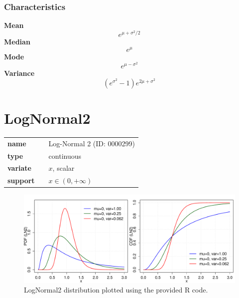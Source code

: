 \subsubsection*{Characteristics}
\smallskip \noindent \hspace{.2cm} \textbf{Mean} 
\begin{equation*}e^{\mu+\sigma^2/2}\end{equation*}
\smallskip \noindent \hspace{.2cm} \textbf{Median} 
\begin{equation*}e^{\mu}\end{equation*}
\smallskip \noindent \hspace{.2cm} \textbf{Mode} 
\begin{equation*}e^{\mu-\sigma^2}\end{equation*}
\smallskip \noindent \hspace{.2cm} \textbf{Variance} 
\begin{equation*}(e^{\sigma^2}\!\!-1) e^{2\mu+\sigma^2}\end{equation*}
\smallskip
\section*{LogNormal2} 

  \bigskip 

\begin{tabular}{p{2cm}cl}
\textbf{name} & & Log-Normal 2 (ID: 0000299)\\ 
 
\textbf{type} & & continuous \\ 

\textbf{variate} & & $x$, scalar \\ 

\textbf{support} & & $x \in (0,+\infty)$
\end{tabular}

\begin{figure}[ht!]
\centering
  \includegraphics[width=140mm]{pics/LogNormal2.pdf}
 \caption{LogNormal2 distribution plotted using the provided R code.}
 \label{fig:LogNormal2}
\end{figure}

